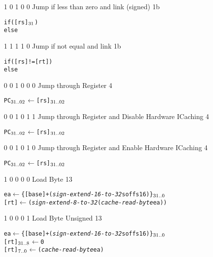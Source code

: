      {1 0 1 0 0} {Jump if less than zero and link (signed)}    {1b}   {\RawTag}
\begin{alltt}
        if ([rs]\(\sb{31}\))
           \rawJxxLink
           \rawJxxLb
           \rawJxxZeroLowBits
        else
           \rawJxxLink
\end{alltt}\rawInstrEnd

     {1 1 1 1 0} {Jump if not equal and link}                   {1b}   {\RawTag}
\begin{alltt}
        if ([rs] != [rt])
           \rawJxxLink
           \rawJxxLb
           \rawJxxZeroLowBits
        else
           \rawJxxLink
\end{alltt}\rawInstrEnd

      {0 0 1 0 0 0} {Jump through Register}   {4}   {\RawTag}
\begin{alltt}
        PC\({\sb{31..02}}\) \(\leftarrow\) [rs]\({\sb{31..02}}\)
        \rawJxxZeroLowBits
\end{alltt}\rawInstrEnd

      {0 0 1 0 1 1} {Jump through Register and Disable Hardware ICaching}   {4}   {\RawTagH}
\begin{alltt}
        PC\({\sb{31..02}}\) \(\leftarrow\) [rs]\({\sb{31..02}}\)
        \rawJxxZeroLowBits
\end{alltt}\rawInstrEnd

      {0 0 1 0 1 0} {Jump through Register and Enable Hardware ICaching}   {4}   {\RawTagH}
\begin{alltt}
        PC\({\sb{31..02}}\) \(\leftarrow\) [rs]\({\sb{31..02}}\)
        \rawJxxZeroLowBits
\end{alltt}\rawInstrEnd

     {1 0 0 0 0}    {Load Byte}               {1}{3} {\RawTag}
\begin{alltt}
        ea    \(\leftarrow\) \{ [base] + ({\em{sign-extend-16-to-32}} soffs16) \}\(\sb{31..0}\)
        [rt]  \(\leftarrow\) ({\em{sign-extend-8-to-32}} ({\em{cache-read-byte}} ea))
\end{alltt}\rawInstrEnd

    {1 0 0 0 1}    {Load Byte Unsigned}      {1}{3} {\RawTag}
\begin{alltt}
        ea \hspace{1mm}      \(\leftarrow\) \{ [base] + ({\em{sign-extend-16-to-32}} soffs16) \}\(\sb{31..0}\)
        [rt]\(\sb{31..8}\) \hspace{.5mm} \(\leftarrow\) 0
        [rt]\(\sb{7..0}\)  \hspace{.25mm} \(\leftarrow\) ({\em{cache-read-byte}} ea)
\end{alltt}\rawInstrEnd

